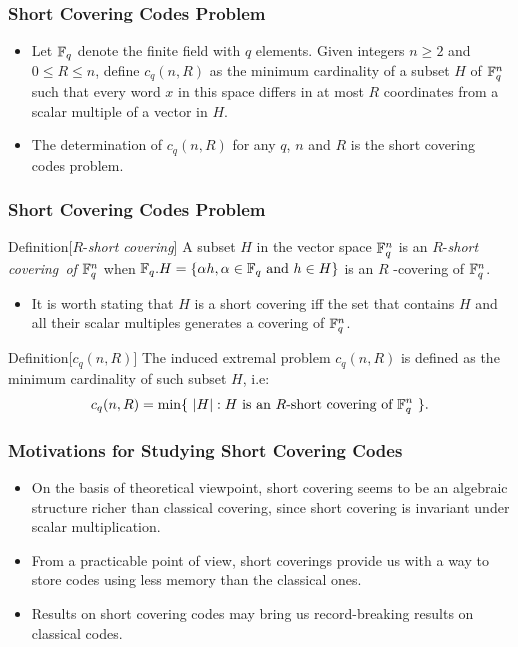 \documentclass{beamer}
\begin{document}
\begin{frame}
  \frametitle{Short Covering Codes Problem}
{
	
\begin{itemize}
	\item<1-> Let $\Bbb{F}_{q}$ denote the finite field with $q$ elements. Given integers $n\geq 2$ and $0 \leq R \leq n$, define $c_{q}(n,R)$ as the minimum cardinality of a subset $H$ of $\Bbb{F}_{q}^{n}$ such that every word $x$ in this space differs in at most $R$ coordinates from a scalar multiple of a vector in $H$.
	\item<2-> The determination of $c_{q}(n,R)$ for any $q$, $n$ and $R$ is the short covering codes problem.
\end{itemize}	 

}
\end{frame}


\begin{frame}
  \frametitle{Short Covering Codes Problem}
{
	
\begin{block}{Definition}[$R$-\textit{short covering}]
\scriptsize
	A subset $H$ in the vector space $\Bbb F_{q}^{n}$ is an $R$-\textit{short covering\ of }$
\Bbb F_{q}^{n}$ when $ \Bbb F_{q}.H=\{\alpha h,\alpha \in \Bbb F_{q} \mbox{ and } h\in H\}$ is an $R$%
-covering of $\Bbb F_{q}^{n}$.
\end{block}
\pause

\begin{itemize}
	\item It is worth stating that $H$ is a short covering iff the set that contains $H$ and all their scalar multiples generates a covering of $\Bbb F_{q}^{n}$.
\end{itemize}

\begin{block}{Definition}[$c_{q}(n,R)$]
\scriptsize
The induced extremal problem $c_{q}(n,R)$ is defined as the minimum cardinality of such subset $H$, i.e:
\[
c_{q}(n,R)=\min \{\ \left| H\right| :H \mbox{ is an } R
\mbox{-short covering of } \Bbb F_{q}^{n}\mathit{\ }\}.
\]\end{block}

}
\end{frame}


\begin{frame}
  \frametitle{Motivations for Studying Short Covering Codes}
{
\begin{itemize}

\item<1-> On the basis of theoretical viewpoint, short covering seems to be an algebraic structure richer than classical covering, since short covering is invariant under scalar multiplication. 
\item<2-> From a practicable point of view, short coverings provide us with a way to store codes using less memory than the classical ones.
\item<3-> Results on short covering codes may bring us record-breaking results on classical codes.

\end{itemize}

}
\end{frame}
\end{document}
